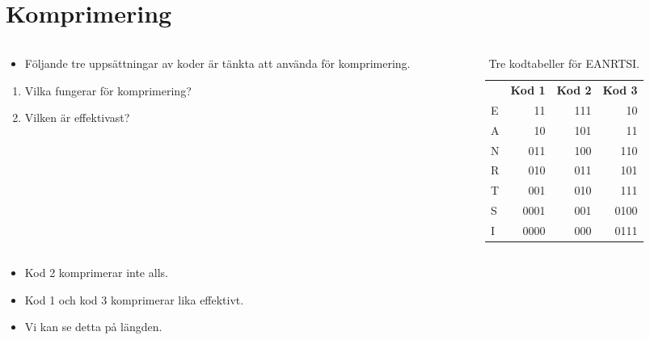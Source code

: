 \mode*

\section{Komprimering}

\begin{frame}
  \begin{columns}
    \begin{column}{0.5\columnwidth}
      \begin{exercise}
        \begin{itemize}
          \item Följande tre uppsättningar av koder är tänkta att använda för 
            komprimering.
        \end{itemize}
        \begin{enumerate}
          \item Vilka fungerar för komprimering?
          \item Vilken är effektivast?
        \end{enumerate}
      \end{exercise}
    \end{column}
    \begin{column}{0.5\columnwidth}
      \begin{table}
        \begin{tabular}{lrrr}
            & \textbf{Kod 1} & \textbf{Kod 2} & \textbf{Kod 3} \\
          E & 11    & 111 & 10 \\
          A & 10    & 101 & 11 \\
          N & 011   & 100 & 110 \\
          R & 010   & 011 & 101 \\
          T & 001   & 010 & 111 \\
          S & 0001  & 001 & 0100 \\
          I & 0000  & 000 & 0111 \\
        \end{tabular}
        \caption{Tre kodtabeller för EANRTSI.}
      \end{table}
    \end{column}
  \end{columns}
\end{frame}

\begin{frame}
  \begin{solution}
    \begin{itemize}
      \item Kod 2 komprimerar inte alls.
      \item Kod 1 och kod 3 komprimerar lika effektivt.
      \item Vi kan se detta på längden.
    \end{itemize}
  \end{solution}
\end{frame}

